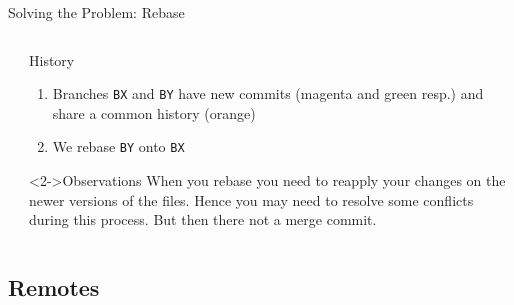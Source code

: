 \documentclass[xetex]{beamer}
\begin{document}
\begin{frame}[fragile]{Solving the Problem: Rebase}
\begin{columns}
\begin{column}{.5\linewidth}
    \end{column}
    \begin{column}{.5\linewidth}
      \begin{exampleblock}{History}
        \begin{enumerate}
          \item Branches \texttt{BX} and \texttt{BY} have new commits (magenta
            and green resp.) and share a common history (orange)
          \item We rebase \texttt{BY} onto \texttt{BX}
        \end{enumerate}
      \end{exampleblock}
      \begin{alertblock}<2->{Observations}
        When you rebase you need to reapply your changes on the newer versions
        of the files. Hence you may need to resolve some conflicts during this
        process. But then there not a merge commit.
      \end{alertblock}
    \end{column}
  \end{columns}
\end{frame}

\subsection{Remotes}
\end{document}
